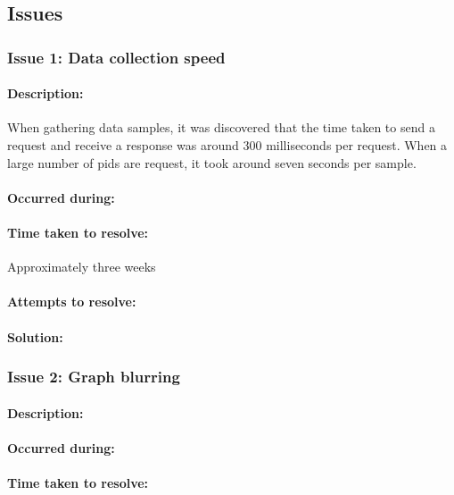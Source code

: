 	\subsection{Issues}{		
		\subsubsection{Issue 1: Data collection speed}{
			\paragraph{Description:}
			When gathering data samples, it was discovered that the time taken to send a request and receive a response was around 300 milliseconds per request. When a large number of pids are request, it took around seven seconds per sample.
			\paragraph{Occurred during:}

			\paragraph{Time taken to resolve:}
			Approximately three weeks
			\paragraph{Attempts to resolve:}
			
			\paragraph{Solution:}
		
		\subsubsection{Issue 2: Graph blurring}{
			\paragraph{Description:}

			\paragraph{Occurred during:}

			\paragraph{Time taken to resolve:}

}}}
